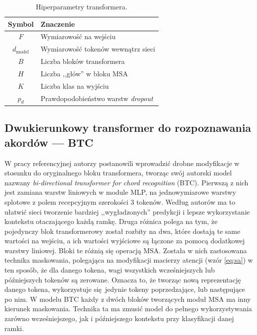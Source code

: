 \begin{table}
    \centering
    \caption{Hiperparametry transformera.}
    \label{tab:transformer_params}
    \begin{tabular}{|c|l|} \hline
        Symbol & Znaczenie \\ \hline
        $F$ & Wymiarowość na wejściu \\
        $d_{\mathrm{model}}$ & Wymiarowość tokenów wewnątrz sieci \\
        $B$ & Liczba bloków transformera \\
        $H$ & Liczba ,,głów'' w bloku MSA \\
        $K$ & Liczba klas na wyjściu \\
        $p_d$ & Prawdopodobieństwo warstw \emph{dropout} \\ \hline
    \end{tabular}
\end{table}

\subsection{Dwukierunkowy transformer do rozpoznawania akordów --- BTC}

W pracy referencyjnej \cite{park_bi-directional_2019} autorzy postanowili wprowadzić drobne modyfikacje w stosunku do oryginalnego bloku transformera, tworząc swój autorski model nazwany \emph{bi-directional transformer for chord recognition} (BTC). Pierwszą z nich jest zamiana warstw liniowych w module MLP, na jednowymiarowe warstwy splotowe z polem recepcyjnym szerokości 3 tokenów.  Według autorów ma to ułatwić sieci tworzenie bardziej ,,wygładzonych'' predykcji i lepsze wykorzystanie kontekstu otaczającego każdą ramkę. Druga różnica polega na tym, że pojedynczy blok transformerowy został rozbity na dwa, które dostają te same wartości na wejściu, a ich wartości wyjściowe są łączone za pomocą dodatkowej warstwy liniowej. Bloki te różnią się operacją MSA.  Została w nich zastosowana technika maskowania, polegająca na modyfikacji macierzy atencji (wzór \ref{eq:sa}) w ten sposób, że dla danego tokena, wagi wszystkich wcześniejszych lub późniejszych tokenów są zerowane. Oznacza to, że tworząc nową reprezentację danego tokena, wykorzystuje się jedynie tokeny poprzedzające, lub następujące po nim. W modelu BTC każdy z dwóch bloków tworzących moduł MSA ma inny kierunek maskowania. Technika ta ma zmusić model do pełnego wykorzystywania zarówno wcześniejszego, jak i późniejszego kontekstu przy klasyfikacji danej ramki.



